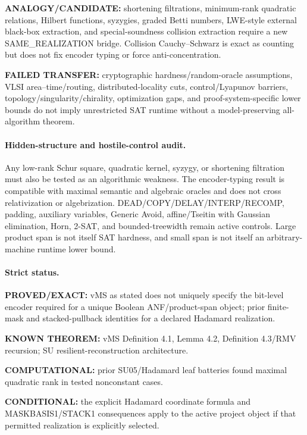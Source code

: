 \documentclass[11pt]{article}
\begin{document}
\textbf{ANALOGY/CANDIDATE:} shortening filtrations, minimum-rank quadratic relations, Hilbert functions, syzygies, graded Betti numbers, LWE-style external black-box extraction, and special-soundness collision extraction require a new SAME\_REALIZATION bridge. Collision Cauchy--Schwarz is exact as counting but does not fix encoder typing or force anti-concentration.

\textbf{FAILED TRANSFER:} cryptographic hardness/random-oracle assumptions, VLSI area--time/routing, distributed-locality cuts, control/Lyapunov barriers, topology/singularity/chirality, optimization gaps, and proof-system-specific lower bounds do not imply unrestricted SAT runtime without a model-preserving all-algorithm theorem.

\paragraph{Hidden-structure and hostile-control audit.}
Any low-rank Schur square, quadratic kernel, syzygy, or shortening filtration must also be tested as an algorithmic weakness. The encoder-typing result is compatible with maximal semantic and algebraic oracles and does not cross relativization or algebrization. DEAD/COPY/DELAY/INTERP/RECOMP, padding, auxiliary variables, Generic Avoid, affine/Tseitin with Gaussian elimination, Horn, 2-SAT, and bounded-treewidth remain active controls. Large product span is not itself SAT hardness, and small span is not itself an arbitrary-machine runtime lower bound.

\paragraph{Strict status.}
\textbf{PROVED/EXACT:} vMS as stated does not uniquely specify the bit-level encoder required for a unique Boolean ANF/product-span object; prior finite-mask and stacked-pullback identities for a declared Hadamard realization.

\textbf{KNOWN THEOREM:} vMS Definition 4.1, Lemma 4.2, Definition 4.3/RMV recursion; SU resilient-reconstruction architecture.

\textbf{COMPUTATIONAL:} prior SU05/Hadamard leaf batteries found maximal quadratic rank in tested nonconstant cases.

\textbf{CONDITIONAL:} the explicit Hadamard coordinate formula and MASKBASIS1/STACK1 consequences apply to the active project object if that permitted realization is explicitly selected.
\end{document}
